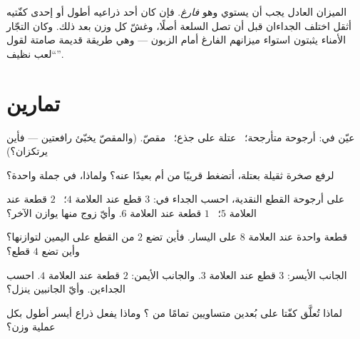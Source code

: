 \begin{remark}\label{rem:g3:levers-and-scales:fair}
الميزان العادل يجب أن يستوي وهو \emph{فارغ}. فإن كان أحد ذراعيه
أطول أو إحدى كفّتيه أثقل اختلف الجداءان قبل أن تصل السلعة أصلًا،
وغشّ كل وزن بعد ذلك. وكان التجّار الأمناء يثبتون استواء ميزانهم
الفارغ أمام الزبون --- وهي طريقة قديمة صامتة لقول ``لعب نظيف''.
\end{remark}

\section{تمارين}

\begin{exercise}[$\star$]\label{exo:g3:levers-and-scales:1}
عيّن   في: أرجوحة متأرجحة؛ \ عتلة على جذع؛
\ مقصّ. (والمقصّ يخبّئ رافعتين --- فأين يرتكزان؟)
\end{exercise}

\begin{exercise}[$\star$]\label{exo:g3:levers-and-scales:2}
لرفع صخرة ثقيلة بعتلة، أتضغط قريبًا من  أم بعيدًا
عنه؟ ولماذا، في جملة واحدة؟
\end{exercise}

\begin{exercise}[$\star$]\label{exo:g3:levers-and-scales:3}
على أرجوحة القطع النقدية، احسب الجداء في: $3$ قطع عند العلامة
$4$؛ \ $2$ قطعة عند العلامة $5$؛ \ $1$ قطعة عند العلامة $6$. وأيّ
زوج منها يوازن الآخر؟
\end{exercise}

\begin{exercise}[$\star$]\label{exo:g3:levers-and-scales:4}
قطعة واحدة عند العلامة $8$ على اليسار. فأين تضع $2$ من القطع على
اليمين لتوازنها؟ وأين تضع $4$ قطع؟
\end{exercise}

\begin{exercise}[$\star$]\label{exo:g3:levers-and-scales:5}
الجانب الأيسر: $3$ قطع عند العلامة $3$. والجانب الأيمن: $2$ قطعة
عند العلامة $4$. احسب الجداءين. وأيّ الجانبين ينزل؟
\end{exercise}

\begin{exercise}[$\star$]\label{exo:g3:levers-and-scales:6}
لماذا تُعلَّق كفّتا  على بُعدين متساويين تمامًا من
؟ وماذا يفعل ذراع أيسر أطول بكل عملية وزن؟
\end{exercise}

